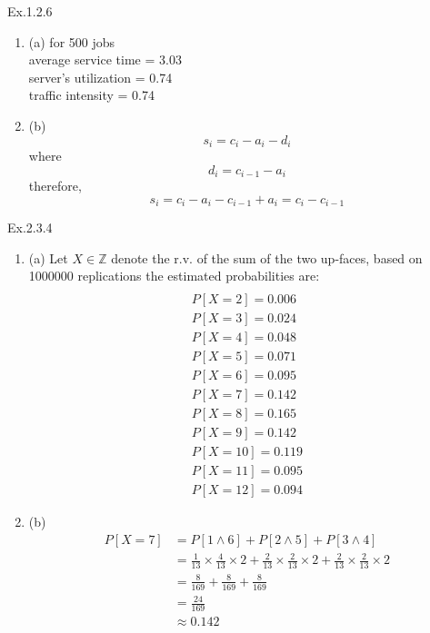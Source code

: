 \documentclass[11pt]{article}
\theoremstyle{definition}
\begin{document}
\begin{enumerate}[leftmargin=0pt, itemsep=3ex]
\begin{enumerate}
    \end{enumerate}

    \problemitem Ex.1.2.6
    
    \begin{enumerate}
        \item (a)
        for 500 jobs
        \\average service time = 3.03
        \\server's utilization = 0.74
        \\traffic intensity = 0.74
        \item (b)   
        $$
        s_i = c_i - a_i - d_i
        $$
        where
        $$
        d_i = c_{i-1} - a_i
        $$
        therefore,
        $$
        s_i = c_i - a_i - c_{i-1} + a_i = c_i - c_{i-1}
        $$
    \end{enumerate}

    \problemitem Ex.2.3.4
        \begin{enumerate}
        \item (a)
        Let $X \in \mathbb{Z}$ denote the r.v. of the sum of the two up-faces,
        based on 1000000 replications the estimated probabilities are:
        \begin{align*}
        \\P[X=2] = 0.006
        \\P[X=3] = 0.024
        \\P[X=4] = 0.048
        \\P[X=5] = 0.071
        \\P[X=6] = 0.095
        \\P[X=7] = 0.142
        \\P[X=8] = 0.165
        \\P[X=9] = 0.142
        \\P[X=10] = 0.119
        \\P[X=11] = 0.095
        \\P[X=12] = 0.094
        \end{align*}
        \item (b)
        \begin{align*}
            P[X=7] &= P[1 \land 6]+P[2 \land 5]+P[3 \land 4]
             \\ &= \frac{1}{13}\times \frac{4}{13} \times 2 + \frac{2}{13}\times \frac{2}{13} \times 2 + \frac{2}{13}\times \frac{2}{13} \times 2 
             \\ &= \frac{8}{169} + \frac{8}{169} + \frac{8}{169}
             \\ &= \frac{24}{169}
             \\ & \approx 0.142
        \end{align*}
        \end{enumerate}


\end{enumerate}
\end{document}
